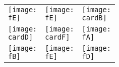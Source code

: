 \documentclass[a4paper]{article}
\newlength{\cardW}
\newlength{\cardH}
\newcommand{\cardB}{cards/detective.png}
\newcommand{\cardD}{cards/godfather.png}
\newcommand{\cardF}{cards/insane.png}
\newcommand{\fA}{cards/4lover.png}
\newcommand{\fB}{cards/4outsider.png}
\newcommand{\fD}{cards/4villager.png}
\newcommand{\fE}{cards/4villager2.png}
\begin{document}
\newpage

\begin{figure}[H]
\centering
\begin{tabular}{|>{\centering\arraybackslash}m{\cardW}|>{\centering\arraybackslash}m{\cardW}|>{\centering\arraybackslash}m{\cardW}|}
    \texttt{[image: \\fE]} &
    \texttt{[image: \\fE]} &
    \texttt{[image: \\cardB]} \\
    \texttt{[image: \\cardD]} &
    \texttt{[image: \\cardF]} &
    \texttt{[image: \\fA]} \\
    \texttt{[image: \\fB]} &
    \texttt{[image: \\fE]} &
    \texttt{[image: \\fD]} \\
\end{tabular}
\end{figure}
\end{document}
